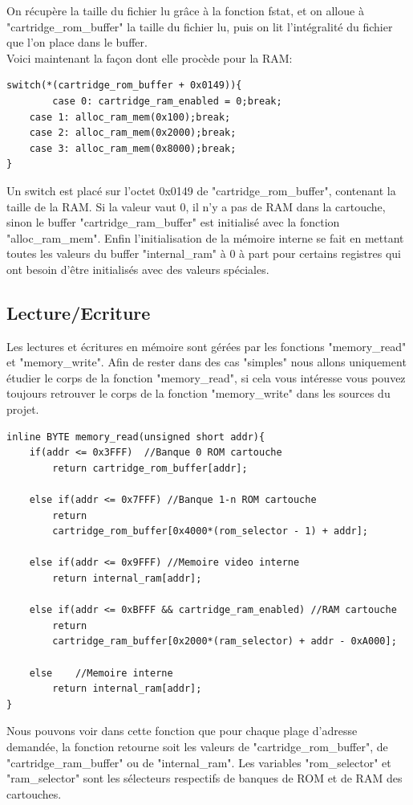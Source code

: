 \documentclass{report}
\begin{document}
On récupère la taille du fichier lu grâce à la fonction fstat, et on alloue à "cartridge\_rom\_buffer" la taille du fichier lu, puis on lit l'intégralité du fichier que l'on place dans le buffer.\\
Voici maintenant la façon dont elle procède pour la RAM:
\begin{lstlisting}
switch(*(cartridge_rom_buffer + 0x0149)){
       	case 0: cartridge_ram_enabled = 0;break;
	case 1: alloc_ram_mem(0x100);break;
	case 2: alloc_ram_mem(0x2000);break;
	case 3: alloc_ram_mem(0x8000);break;
}
\end{lstlisting}
Un switch est placé sur l'octet 0x0149 de "cartridge\_rom\_buffer", contenant la taille de la RAM. Si la valeur vaut 0, il n'y a pas de RAM dans la cartouche, sinon le buffer "cartridge\_ram\_buffer" est initialisé avec la fonction "alloc\_ram\_mem".
Enfin l'initialisation de la mémoire interne se fait en mettant toutes les valeurs du buffer "internal\_ram" à 0 à part pour certains registres qui ont besoin d'être initialisés avec des valeurs spéciales.
\subsection{Lecture/Ecriture}
Les lectures et écritures en mémoire sont gérées par les fonctions "memory\_read" et "memory\_write". Afin de rester dans des cas "simples" nous allons uniquement étudier le corps de la fonction "memory\_read", si cela vous intéresse vous pouvez toujours retrouver le corps de la fonction "memory\_write" dans les sources du projet.
\begin{lstlisting}
inline BYTE memory_read(unsigned short addr){
	if(addr <= 0x3FFF) 	//Banque 0 ROM cartouche
		return cartridge_rom_buffer[addr];

	else if(addr <= 0x7FFF) //Banque 1-n ROM cartouche
		return 
		cartridge_rom_buffer[0x4000*(rom_selector - 1) + addr];

	else if(addr <= 0x9FFF) //Memoire video interne
		return internal_ram[addr];

	else if(addr <= 0xBFFF && cartridge_ram_enabled) //RAM cartouche
		return 
		cartridge_ram_buffer[0x2000*(ram_selector) + addr - 0xA000];

	else 	//Memoire interne
		return internal_ram[addr];
}
\end{lstlisting}
Nous pouvons voir dans cette fonction que pour chaque plage d'adresse demandée, la fonction retourne soit les valeurs de "cartridge\_rom\_buffer", de "cartridge\_ram\_buffer" ou de "internal\_ram".
Les variables "rom\_selector" et "ram\_selector" sont les sélecteurs respectifs de banques de ROM et de RAM des cartouches.
\end{document}

